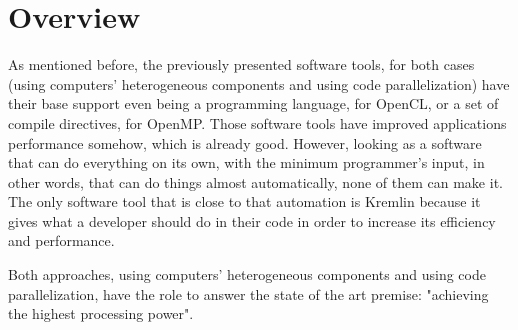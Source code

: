 \section{Overview}

As mentioned before, the previously presented software tools, for both cases (using computers' heterogeneous components and using code parallelization) have their base support even being a programming language, for OpenCL, or a set of compile directives, for OpenMP. Those software tools have improved applications performance somehow, which is already good. However, looking as a software that can do everything on its own, with the minimum programmer's input, in other words, that can do things almost automatically, none of them can make it. The only software tool that is close to that automation is Kremlin because it gives what a developer should do in their code in order to increase its efficiency and performance.

Both approaches, using computers' heterogeneous components and using code parallelization, have the role to answer the state of the art premise: "achieving the highest processing power".  
